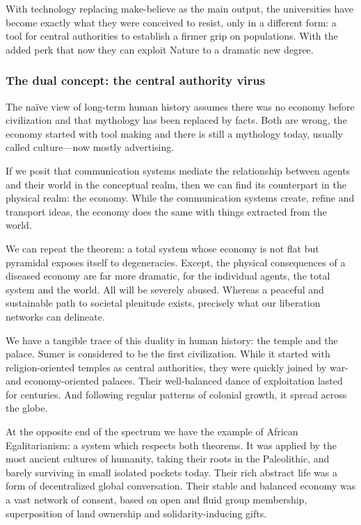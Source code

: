 \documentclass[11pt]{article}
\begin{document}
With technology replacing make-believe as the main output, the universities have become
exactly what they were conceived to resist, only in a different form: a tool for central
authorities to establish a firmer grip on populations. With the added perk that now they
can exploit Nature to a dramatic new degree.

\subsubsection*{The dual concept: the central authority virus}

The naïve view of long-term human history assumes there was no economy before
civilization and that mythology has been replaced by facts. Both are wrong, the economy
started with tool making and there is still a mythology today, usually called
culture---now mostly advertising.

If we posit that communication systems mediate the relationship between agents and their
world in the conceptual realm, then we can find its counterpart in the physical realm:
the economy. While the communication systems create, refine and transport ideas, the
economy does the same with things extracted from the world.

We can repeat the theorem: a total system whose economy is not flat but pyramidal
exposes itself to degeneracies. Except, the physical consequences of a diseased economy
are far more dramatic, for the individual agents, the total system and the world. All
will be severely abused. Whereas a peaceful and sustainable path to societal plenitude
exists, precisely what our liberation networks can delineate.

We have a tangible trace of this duality in human history: the temple and the palace.
Sumer is considered to be the first civilization. While it started with
religion-oriented temples as central authorities, they were quickly joined by war- and
economy-oriented palaces. Their well-balanced dance of exploitation lasted for
centuries. And following regular patterns of colonial growth, it spread across the
globe.

At the opposite end of the spectrum we have the example of African Egalitarianism: a
system which respects both theorems. It was applied by the most ancient cultures of
humanity, taking their roots in the Paleolithic, and barely surviving in small isolated
pockets today. Their rich abstract life was a form of decentralized global conversation.
Their stable and balanced economy was a vast network of consent, based on open and fluid
group membership, superposition of land ownership and solidarity-inducing gifts.
\end{document}
